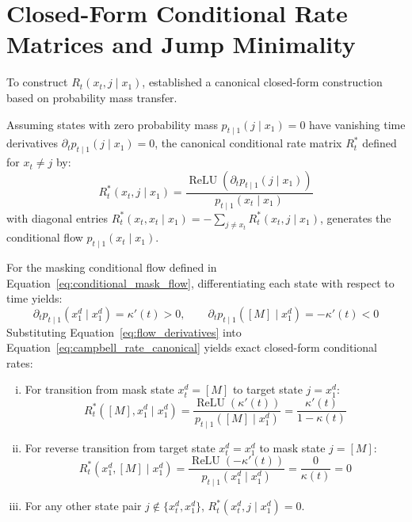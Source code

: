 \section{Closed-Form Conditional Rate Matrices and Jump Minimality}

To construct $R_t(x_t, j \mid x_1)$, \citet{Campbell2024} established a canonical closed-form construction based on probability mass transfer.

\begin{pro}
\label{pro:canonical_rate}
Assuming states with zero probability mass $p_{t \mid 1}(j \mid x_1) = 0$ have vanishing time derivatives $\partial_t p_{t \mid 1}(j \mid x_1) = 0$, the canonical conditional rate matrix $R_t^*$ defined for $x_t \ne j$ by:
\begin{equation}
R_t^*(x_t, j \mid x_1) = \frac{\operatorname{ReLU}\left( \partial_t p_{t \mid 1}(j \mid x_1) \right)}{p_{t \mid 1}(x_t \mid x_1)}
\label{eq:campbell_rate_canonical}
\end{equation}
with diagonal entries $R_t^*(x_t, x_t \mid x_1) = - \sum_{j \ne x_t} R_t^*(x_t, j \mid x_1)$, generates the conditional flow $p_{t \mid 1}(x_t \mid x_1)$.
\end{pro}

For the masking conditional flow defined in Equation~\ref{eq:conditional_mask_flow}, differentiating each state with respect to time yields:
\begin{equation}
\partial_t p_{t \mid 1}(x_1^d \mid x_1^d) = \kappa'(t) > 0, \qquad \partial_t p_{t \mid 1}([M] \mid x_1^d) = -\kappa'(t) < 0
\label{eq:flow_derivatives}
\end{equation}
Substituting Equation~\ref{eq:flow_derivatives} into Equation~\ref{eq:campbell_rate_canonical} yields exact closed-form conditional rates:
\begin{enumerate}[(i)]
\item For transition from mask state $x_t^d = [M]$ to target state $j = x_1^d$:
\begin{equation}
R_t^*([M], x_1^d \mid x_1^d) = \frac{\operatorname{ReLU}(\kappa'(t))}{p_{t \mid 1}([M] \mid x_1^d)} = \frac{\kappa'(t)}{1 - \kappa(t)}
\label{eq:rate_unmask}
\end{equation}
\item For reverse transition from target state $x_t^d = x_1^d$ to mask state $j = [M]$:
\begin{equation}
R_t^*(x_1^d, [M] \mid x_1^d) = \frac{\operatorname{ReLU}(-\kappa'(t))}{p_{t \mid 1}(x_1^d \mid x_1^d)} = \frac{0}{\kappa(t)} = 0
\label{eq:rate_remask_zero}
\end{equation}
\item For any other state pair $j \notin \{x_t^d, x_1^d\}$, $R_t^*(x_t^d, j \mid x_1^d) = 0$.
\end{enumerate}

